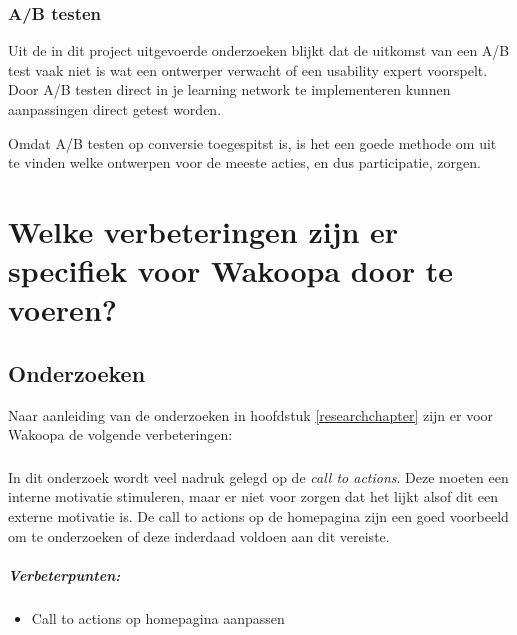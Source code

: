 \documentclass[a4paper, 10pt, pdftex]{report}
\begin{document}
    \subsection{A/B testen}
      Uit de in dit project uitgevoerde onderzoeken blijkt dat de uitkomst van een A/B test vaak niet is wat een ontwerper verwacht of een usability expert voorspelt. Door A/B testen direct in je learning network te implementeren kunnen aanpassingen direct getest worden.

      Omdat A/B testen op conversie toegespitst is, is het een goede methode om uit te vinden welke ontwerpen voor de meeste acties, en dus participatie, zorgen.

  \newpage
  \chapter{Welke verbeteringen zijn er specifiek voor Wakoopa door te voeren?}
    \newpage

    \section{Onderzoeken}
    Naar aanleiding van de onderzoeken in hoofdstuk \ref{researchchapter} zijn er voor Wakoopa de volgende verbeteringen:

 \subsection{\cite{Beenen2004}}
      In dit onderzoek wordt veel nadruk gelegd op de \emph{call to actions}. Deze moeten een interne motivatie stimuleren, maar er niet voor zorgen dat het lijkt alsof dit een externe motivatie is. De call to actions op de homepagina zijn een goed voorbeeld om te onderzoeken of deze inderdaad voldoen aan dit vereiste.

      \paragraph{\textbf{Verbeterpunten:}}
      \begin{itemize}
        \item Call to actions op homepagina aanpassen
      \end{itemize}
\end{document}
